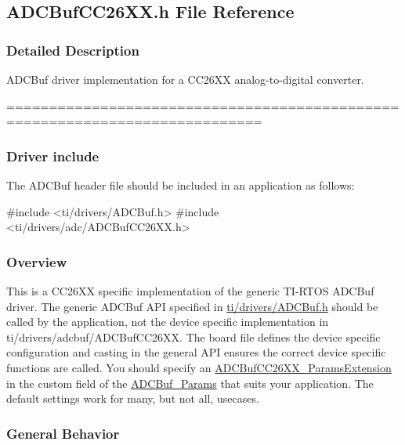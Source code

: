 \subsection{A\+D\+C\+Buf\+C\+C26\+X\+X.\+h File Reference}
\label{_a_d_c_buf_c_c26_x_x_8h}


\subsubsection{Detailed Description}
A\+D\+C\+Buf driver implementation for a C\+C26\+X\+X analog-\/to-\/digital converter. 

============================================================================

\subsubsection*{Driver include}

The A\+D\+C\+Buf header file should be included in an application as follows\+: 
\begin{DoxyCode}
\textcolor{preprocessor}{#include <ti/drivers/ADCBuf.h>}
\textcolor{preprocessor}{#include <ti/drivers/adc/ADCBufCC26XX.h>}
\end{DoxyCode}


\subsubsection*{Overview}

This is a C\+C26\+X\+X specific implementation of the generic T\+I-\/\+R\+T\+O\+S A\+D\+C\+Buf driver. The generic A\+D\+C\+Buf A\+P\+I specified in \hyperlink{_a_d_c_buf_8h}{ti/drivers/\+A\+D\+C\+Buf.\+h} should be called by the application, not the device specific implementation in ti/drivers/adcbuf/\+A\+D\+C\+Buf\+C\+C26\+X\+X. The board file defines the device specific configuration and casting in the general A\+P\+I ensures the correct device specific functions are called. You should specify an \hyperlink{struct_a_d_c_buf_c_c26_x_x___params_extension}{A\+D\+C\+Buf\+C\+C26\+X\+X\+\_\+\+Params\+Extension} in the custom field of the \hyperlink{struct_a_d_c_buf___params}{A\+D\+C\+Buf\+\_\+\+Params} that suits your application. The default settings work for many, but not all, usecases.

\subsubsection*{General Behavior}

